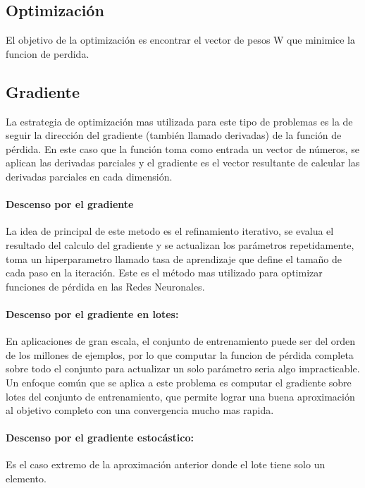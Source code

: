 \documentclass[a4paper,12pt,spanish]{book}
\begin{document}
    \subsection{Optimización}
      El objetivo de la optimización es encontrar el vector de pesos W que minimice la funcion de perdida.

    \subsection{Gradiente} 
      La estrategia de optimización mas utilizada para este tipo de problemas es la de seguir la dirección del gradiente (también llamado derivadas) de la función de pérdida.
      En este caso que la función toma como entrada un vector de números, se aplican las derivadas parciales y el gradiente es el vector resultante de calcular las derivadas parciales
      en cada dimensión.

      \paragraph{Descenso por el gradiente}
	La idea de principal de este metodo es el refinamiento iterativo, se evalua el resultado del calculo del gradiente y se actualizan los parámetros repetidamente, 
	toma un hiperparametro llamado tasa de aprendizaje que define el tamaño de cada paso en la iteración.
	Este es el método mas utilizado para optimizar funciones de pérdida en las Redes Neuronales. 

      \paragraph{Descenso por el gradiente en lotes:} 
	En aplicaciones de gran escala, el conjunto de entrenamiento puede ser del orden de los millones de ejemplos, por lo que computar la funcion de 
	pérdida completa sobre todo el conjunto para actualizar un solo parámetro seria algo impracticable.
	Un enfoque común que se aplica a este problema es computar el gradiente sobre lotes del conjunto de entrenamiento, que permite lograr una buena aproximación al objetivo completo con
	una convergencia mucho mas rapida.

      \paragraph{Descenso por el gradiente estocástico:} 
	Es el caso extremo de la aproximación anterior donde el lote tiene solo un elemento.
\end{document}
